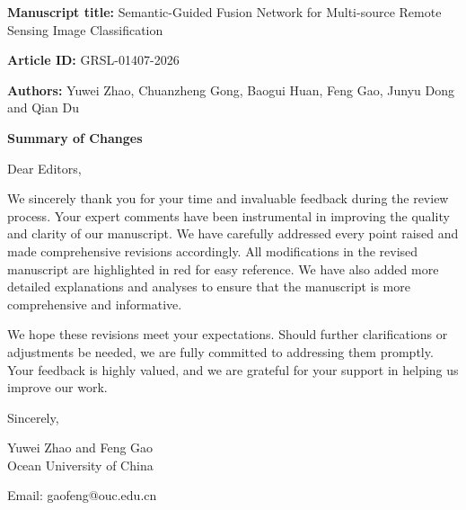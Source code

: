 \documentclass[a4paper,12pt]{article}
\begin{document}
\begin{mybox}
  \large

  \vspace{5mm}

  \textbf{Manuscript title:} Semantic-Guided Fusion Network for Multi-source Remote Sensing Image Classification

  \textbf{Article ID:} GRSL-01407-2026

  \textbf{Authors:} Yuwei Zhao, Chuanzheng Gong, Baogui Huan, Feng Gao, Junyu Dong and Qian Du
  
  \vspace{5mm}

\end{mybox}


\begin{center}
  \LARGE\bf Summary of Changes
\end{center}

Dear Editors,

We sincerely thank you for your time and invaluable feedback during the review process. Your expert comments have been instrumental in improving the quality and clarity of our manuscript. We have carefully addressed every point raised and made comprehensive revisions accordingly. All modifications in the revised manuscript are highlighted in red for easy reference. We have also added more detailed explanations and analyses to ensure that the manuscript is more comprehensive and informative.

We hope these revisions meet your expectations. Should further clarifications or adjustments be needed, we are fully committed to addressing them promptly. Your feedback is highly valued, and we are grateful for your support in helping us improve our work.

Sincerely,

Yuwei Zhao and Feng Gao \\

Ocean University of China

Email: gaofeng@ouc.edu.cn

\newpage





\end{document}
